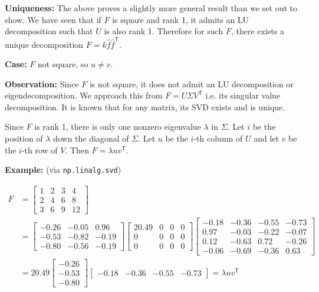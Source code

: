\documentclass{article}
\begin{document}
\begin{enumerate}[label=(\roman*)]
\textbf{Uniqueness:} The above proves a slightly more general result than we set out to show. We have seen that if $F$ is square and rank 1, it admits an LU decomposition such that $U$ is also rank 1. Therefore for such $F$, there exists a unique decomposition $F=k\hat{f}\hat{f}^\mathsf{T}$.

\textbf{Case:} $F$ not square, so $u \neq v$.

\textbf{Observation:} Since $F$ is not square, it does not admit an LU decomposition or eigendecomposition. We approach this from $F=U\Sigma V^\mathsf{T}$ i.e. its singular value decomposition. It is known that for any matrix, its SVD exists and is unique.

Since $F$ is rank 1, there is only one nonzero eigenvalue $\lambda$ in $\Sigma$. Let $i$ be the position of $\lambda$ down the diagonal of $\Sigma$. Let $u$ be the $i$-th column of $U$ and let $v$ be the $i$-th row of $V$. Then $F=\lambda u v^\mathsf{T}$.

\textbf{Example:} (via \texttt{np.linalg.svd})

\begin{equation}
\begin{aligned}
F &= 
\begin{bmatrix}
1 & 2 & 3 & 4 \\
2 & 4 & 6 & 8 \\
3 & 6 & 9 & 12
\end{bmatrix} \\
&=
\begin{bmatrix}
-0.26 & -0.05 & 0.96 \\
-0.53 & -0.82 & -0.19 \\
-0.80 & -0.56 & -0.19
\end{bmatrix}
\begin{bmatrix}
20.49 & 0 & 0 & 0 \\
0 & 0 & 0 & 0 \\
0 & 0 & 0 & 0
\end{bmatrix}
\begin{bmatrix}
-0.18 & -0.36 & -0.55 & -0.73 \\
0.97 & -0.03 & -0.22 & -0.07 \\
0.12 & -0.63 & 0.72 & -0.26 \\
-0.06 & -0.69 & -0.36 & 0.63
\end{bmatrix} \\
&=
20.49
\begin{bmatrix}
-0.26 \\
-0.53 \\
-0.80
\end{bmatrix}
\begin{bmatrix}
-0.18 & -0.36 & -0.55 & -0.73
\end{bmatrix}
= \lambda u v^\mathsf{T}
\end{aligned}
\end{equation}


\end{enumerate}
\end{document}
